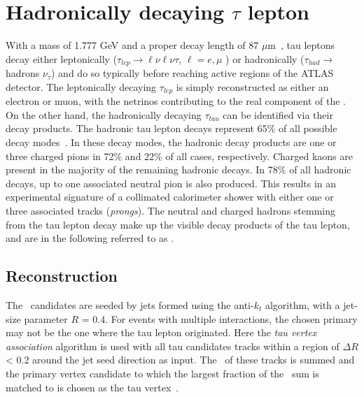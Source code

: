 \large

\section{Hadronically decaying \texorpdfstring{$\tau$}{tau} lepton}
\label{sec:rec:tau}
With a mass of 1.777 GeV and a proper decay length
of 87 $\mu$m~\cite{PDG}, tau leptons decay either leptonically
($\tau_{lep} \rightarrow \ell \nu \ell \nu \tau$, $\ell  = e, \mu$ ) 
or hadronically ($\tau_{had} \rightarrow$ hadrons $\nu_{\tau}$) 
and do so typically before reaching active
regions of the \hbox{ATLAS} detector. 
The leptonically decaying $\tau_{lep}$ is simply reconstructed
as either an electron or muon, with the netrinos contributing 
to the real component of the \met. 
On the other hand, the hadronically decaying $\tau_{tau}$ 
can be identified via their decay products. 
The hadronic tau lepton decays represent 65\% of all possible decay modes~\cite{PDG}. 
In these decay modes, the hadronic decay products are 
one or three charged pions in 72\% and 22\% of all cases, respectively. 
Charged kaons are present in the 
majority of the remaining hadronic decays. 
In 78\% of all hadronic decays, up to one associated neutral pion is
also produced. 
This results in an experimental signature of a collimated
calorimeter shower with either one or three associated tracks (\textit{prongs}).
The neutral and charged hadrons stemming from 
the tau lepton decay make up the visible
decay products of the tau lepton, 
and are in the following referred to as \tauhadvis.

\subsection{Reconstruction}
The \tauhadvis\ candidates are
seeded by jets formed using the anti-$k_t$ algorithm,
with a jet-size parameter $R$ = 0.4. 
For events with multiple interactions, the chosen primary may not be the
one where the tau lepton originated. 
Here the \textit{tau vertex association} algorithm is used with 
all tau candidates tracks within a region of $\Delta R$ < 0.2 
around the jet seed direction as input. 
The \pt\ of these tracks is summed and the 
primary vertex candidate to which the largest fraction
of the \pt\ sum is matched to is chosen as the tau vertex~\cite{ATLAS-CONF-2014-018}.

